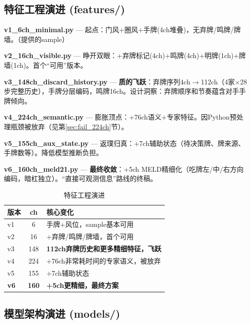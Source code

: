 \documentclass{article}
\begin{document}
\subsection{特征工程演进 (features/)}

\textbf{v1\_6ch\_minimal.py} — 起点：门风+圈风+手牌(4ch堆叠)，无弃牌/鸣牌/牌墙。（提供的sample）

\textbf{v2\_16ch\_visible.py} — 睁开双眼：+弃牌标记(4ch)+鸣牌(4ch)+明牌(1ch)+牌墙(1ch)。首个``可用''版本。

\textbf{v3\_148ch\_discard\_history.py} — \textbf{质的飞跃}：弃牌序列4ch$\rightarrow$112ch（4家$\times$28步完整历史），手牌分层编码，鸣牌16ch。设计洞察：弃牌顺序和节奏蕴含对手手牌倾向。

\textbf{v4\_224ch\_semantic.py} — 膨胀顶点：+76ch语义+专家特征。因Python预处理瓶颈被放弃（见第\ref{sec:fail_224ch}节）。

\textbf{v5\_155ch\_aux\_state.py} — 返璞归真：+7ch辅助状态（待决策牌、牌来源、手牌数等）。降低模型推断负担。

\textbf{v6\_160ch\_meld21.py} — \textbf{最终收敛}：+5ch MELD精细化（吃牌左/中/右方向编码，暗杠独立）。``直接可观测信息''路线的终稿。

\begin{table}[ht]
\caption{特征工程演进}
\label{tab:feature_evo}
\begin{center}
\footnotesize
\begin{tabular}{lcl}
\toprule
版本 & ch & 核心变化 \\
\midrule
v1 & 6   & 手牌+风位，sample基本可用 \\
v2 & 16  & +弃牌/鸣牌/牌墙，首个可用 \\
v3 & 148 & \textbf{112ch弃牌历史和更多精细特征，飞跃} \\
v4 & 224 & +76ch非常耗时间的专家语义，被放弃 \\
v5 & 155 & +7ch辅助状态 \\
\textbf{v6} & \textbf{160} & \textbf{+5ch更精细，最终方案} \\
\bottomrule
\end{tabular}
\end{center}
\end{table}

\subsection{模型架构演进 (models/)}
\end{document}
